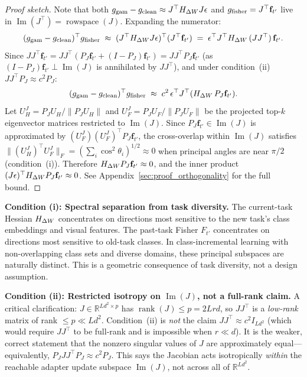 \begin{proof}[Proof sketch]
Note that both $g_{\mathrm{gam}} - g_{\mathrm{clean}} \approx J^\top H_{\Delta W} J\epsilon$ and
$g_{\mathrm{fisher}} = J^\top\mathbf{f}_{t'}$ live in $\operatorname{Im}(J^\top) = \operatorname{rowspace}(J)$.
Expanding the numerator:
\begin{equation}
  (g_{\mathrm{gam}}-g_{\mathrm{clean}})^\top g_{\mathrm{fisher}}
  \;\approx\; (J^\top H_{\Delta W} J\epsilon)^\top (J^\top\mathbf{f}_{t'})
  \;=\; \epsilon^\top J^\top H_{\Delta W}\, (JJ^\top)\, \mathbf{f}_{t'}.
  \label{eq:dot_expand}
\end{equation}
Since $JJ^\top \mathbf{f}_{t'} = JJ^\top (P_J\mathbf{f}_{t'} + (I-P_J)\mathbf{f}_{t'})
= JJ^\top P_J\mathbf{f}_{t'}$ (as $(I-P_J)\mathbf{f}_{t'} \perp \operatorname{Im}(J)$ is
annihilated by $JJ^\top$), and under condition~(ii) $JJ^\top P_J \approx c^2 P_J$:
\begin{equation}
  (g_{\mathrm{gam}}-g_{\mathrm{clean}})^\top g_{\mathrm{fisher}} \;\approx\; c^2\,\epsilon^\top J^\top (H_{\Delta W}\,P_J\mathbf{f}_{t'}).
  \label{eq:dot_simplified}
\end{equation}
Let $U_H^J = P_J U_H / \|P_J U_H\|$ and $U_F^J = P_J U_F / \|P_J U_F\|$ be the
projected top-$k$ eigenvector matrices restricted to $\operatorname{Im}(J)$.
Since $P_J\mathbf{f}_{t'} \in \operatorname{Im}(J)$ is approximated by $(U_F^J)(U_F^J)^\top P_J\mathbf{f}_{t'}$,
the cross-overlap within $\operatorname{Im}(J)$ satisfies
$\|(U_H^J)^\top U_F^J\|_F = (\sum_i \cos^2\theta_i)^{1/2} \approx 0$
when principal angles are near $\pi/2$ (condition~(i)).
Therefore $H_{\Delta W} P_J\mathbf{f}_{t'} \approx 0$,
and the inner product $(J\epsilon)^\top H_{\Delta W} P_J\mathbf{f}_{t'} \approx 0$.
See Appendix~\ref{sec:proof_orthogonality} for the full bound.
\end{proof}

\textbf{Condition (i): Spectral separation from task diversity.}
The current-task Hessian $H_{\Delta W}$ concentrates on directions most sensitive to
the new task's class embeddings and visual features.
The past-task Fisher $F_{t'}$ concentrates on directions most sensitive to old-task classes.
In class-incremental learning with non-overlapping class sets and diverse domains,
these principal subspaces are naturally distinct.
This is a geometric consequence of task diversity, not a design assumption.

\textbf{Condition (ii): Restricted isotropy on $\operatorname{Im}(J)$, not a full-rank claim.}
A critical clarification: $J \in \mathbb{R}^{Ld^2 \times p}$ has $\operatorname{rank}(J) \leq p = 2Lrd$,
so $JJ^\top$ is a \emph{low-rank} matrix of rank $\leq p \ll Ld^2$.
Condition~(ii) is \emph{not} the claim $JJ^\top \approx c^2 I_{Ld^2}$ (which would require
$JJ^\top$ to be full-rank and is impossible when $r \ll d$).
It is the weaker, correct statement that the nonzero singular values of $J$
are approximately equal---equivalently, $P_J JJ^\top P_J \approx c^2 P_J$.
This says the Jacobian acts isotropically \emph{within} the reachable adapter update subspace
$\operatorname{Im}(J)$, not across all of $\mathbb{R}^{Ld^2}$.

